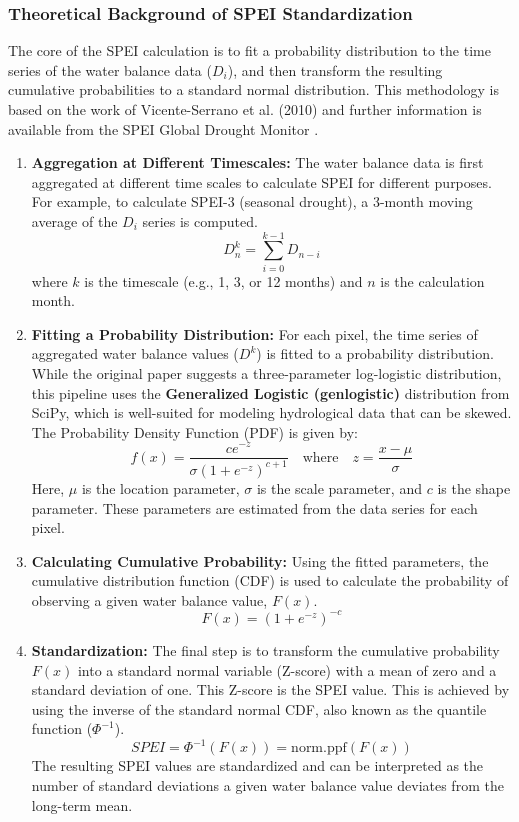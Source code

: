 \documentclass[12pt, a4paper]{article}
\begin{document}
\subsubsection{Theoretical Background of SPEI Standardization}
The core of the SPEI calculation is to fit a probability distribution to the time series of the water balance data ($D_i$), and then transform the resulting cumulative probabilities to a standard normal distribution. This methodology is based on the work of Vicente-Serrano et al. (2010) \cite{vicente2010multiscalar} and further information is available from the SPEI Global Drought Monitor \cite{spei_csic}.

\begin{enumerate}
    \item \textbf{Aggregation at Different Timescales:} The water balance data is first aggregated at different time scales to calculate SPEI for different purposes. For example, to calculate SPEI-3 (seasonal drought), a 3-month moving average of the $D_i$ series is computed.
    \[ D^k_n = \sum_{i=0}^{k-1} D_{n-i} \]
    where $k$ is the timescale (e.g., 1, 3, or 12 months) and $n$ is the calculation month.

    \item \textbf{Fitting a Probability Distribution:} For each pixel, the time series of aggregated water balance values ($D^k$) is fitted to a probability distribution. While the original paper suggests a three-parameter log-logistic distribution, this pipeline uses the \textbf{Generalized Logistic (genlogistic)} distribution from SciPy, which is well-suited for modeling hydrological data that can be skewed. The Probability Density Function (PDF) is given by:
    \[ f(x) = \frac{c e^{-z}}{\sigma (1+e^{-z})^{c+1}} \quad \text{where} \quad z = \frac{x-\mu}{\sigma} \]
    Here, $\mu$ is the location parameter, $\sigma$ is the scale parameter, and $c$ is the shape parameter. These parameters are estimated from the data series for each pixel.

    \item \textbf{Calculating Cumulative Probability:} Using the fitted parameters, the cumulative distribution function (CDF) is used to calculate the probability of observing a given water balance value, $F(x)$.
    \[ F(x) = \left(1+e^{-z}\right)^{-c} \]

    \item \textbf{Standardization:} The final step is to transform the cumulative probability $F(x)$ into a standard normal variable (Z-score) with a mean of zero and a standard deviation of one. This Z-score is the SPEI value. This is achieved by using the inverse of the standard normal CDF, also known as the quantile function ($\Phi^{-1}$).
    \[ SPEI = \Phi^{-1}(F(x)) = \text{norm.ppf}(F(x)) \]
    The resulting SPEI values are standardized and can be interpreted as the number of standard deviations a given water balance value deviates from the long-term mean.
\end{enumerate}
\end{document}
